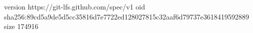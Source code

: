 version https://git-lfs.github.com/spec/v1
oid sha256:89cd5a9de5d5cc35816d7e7722ed128027815c32aaf6d79737e3618419592889
size 174916
